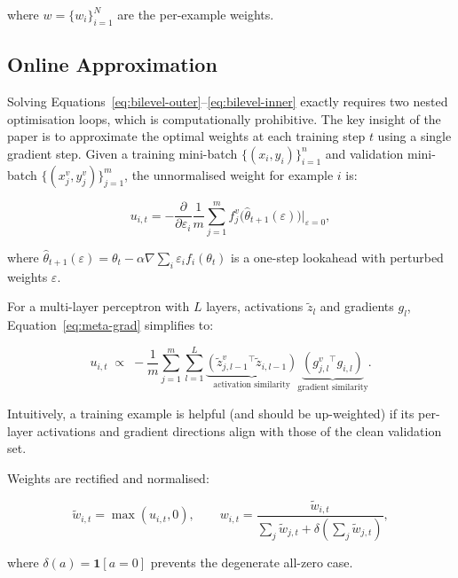 \documentclass{article}
\begin{document}
where $w = \{w_i\}_{i=1}^N$ are the per-example weights.

\subsection{Online Approximation}

Solving Equations~\eqref{eq:bilevel-outer}--\eqref{eq:bilevel-inner} exactly
requires two nested optimisation loops, which is computationally prohibitive.
The key insight of the paper is to approximate the optimal weights at each
training step $t$ using a single gradient step.
Given a training mini-batch $\{(x_i, y_i)\}_{i=1}^n$ and validation
mini-batch $\{(x_j^v, y_j^v)\}_{j=1}^m$, the unnormalised weight for
example $i$ is:

\begin{equation}
  u_{i,t} = -\frac{\partial}{\partial \varepsilon_i}
             \frac{1}{m}\sum_{j=1}^m
             f_j^v\!\bigl(\hat\theta_{t+1}(\varepsilon)\bigr)\bigg|_{\varepsilon=0},
  \label{eq:meta-grad}
\end{equation}

where $\hat\theta_{t+1}(\varepsilon) = \theta_t -
\alpha \nabla \sum_i \varepsilon_i f_i(\theta_t)$
is a one-step lookahead with perturbed weights $\varepsilon$.

For a multi-layer perceptron with $L$ layers, activations
$\tilde{z}_{l}$ and gradients $g_l$, Equation~\eqref{eq:meta-grad}
simplifies to:

\begin{equation}
  u_{i,t} \;\propto\;
  -\frac{1}{m}\sum_{j=1}^{m}\sum_{l=1}^{L}
  \underbrace{(\tilde{z}_{j,l-1}^v{}^\top \tilde{z}_{i,l-1})}_{\text{activation similarity}}
  \underbrace{(g_{j,l}^v{}^\top g_{i,l})}_{\text{gradient similarity}}.
  \label{eq:similarity}
\end{equation}

Intuitively, a training example is helpful (and should be up-weighted) if its
per-layer activations and gradient directions align with those of the clean
validation set.

Weights are rectified and normalised:

\begin{equation}
  \tilde{w}_{i,t} = \max(u_{i,t}, 0), \qquad
  w_{i,t} = \frac{\tilde{w}_{i,t}}{\sum_j \tilde{w}_{j,t} + \delta(\sum_j \tilde{w}_{j,t})},
  \label{eq:normalise}
\end{equation}

where $\delta(a) = \mathbf{1}[a=0]$ prevents the degenerate all-zero case.
\end{document}
